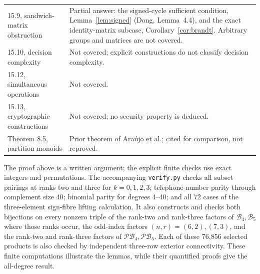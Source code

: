 \documentclass[11pt,a4paper]{article}
\newcommand{\B}{\mathcal B}
\newcommand{\PB}{\mathcal{PB}}
\begin{document}
\begin{longtable}{@{}p{}p{}@{}}
15.9, sandwich-matrix obstruction & Partial answer: the signed-cycle sufficient condition, Lemma~\ref{lem:signed} (Dong, Lemma~4.4), and the exact identity-matrix subcase, Corollary~\ref{cor:brandt}. Arbitrary groups and matrices are not covered.\\
15.10, decision complexity & Not covered; explicit constructions do not classify decision complexity.\\
15.12, simultaneous operations & Not covered.\\
15.13, cryptographic constructions & Not covered; no security property is deduced.\\
Theorem 8.5, partition monoids & Prior theorem of Ara\'ujo et al.; cited for comparison, not reproved.\\\bottomrule
\end{longtable}\endgroup

The proof above is a written argument; the explicit finite checks use exact integers and permutations. The accompanying \texttt{verify.py} checks all subset pairings at ranks two and three for $k=0,1,2,3$; telephone-number parity through complement size 40; binomial parity for degrees 4--40; and all 72 cases of the three-element sign-fibre lifting calculation. It also constructs and checks both bijections on every nonzero triple of the rank-two and rank-three factors of $\B_4,\B_5$ where those ranks occur, the odd-index factors $(n,r)=(6,2),(7,3)$, and the rank-two and rank-three factors of $\PB_4,\PB_5$. Each of these 76,856 selected products is also checked by independent three-row exterior connectivity. These finite computations illustrate the lemmas, while their quantified proofs give the all-degree result.
\end{document}
